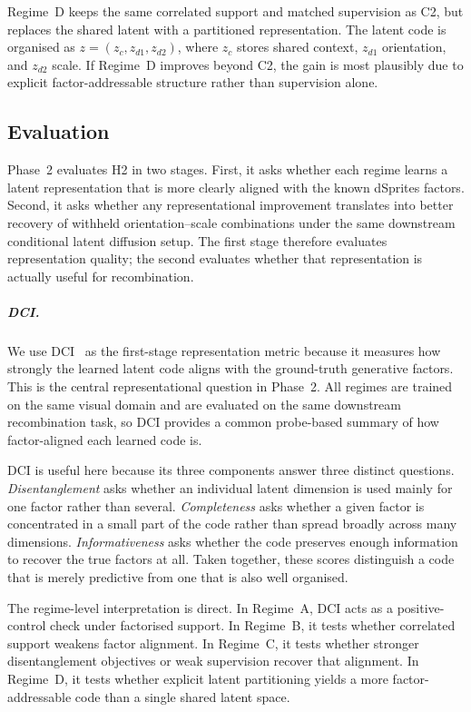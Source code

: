 Regime~D keeps the same correlated support and matched supervision as C2, but replaces the shared latent with a partitioned representation. The latent code is organised as \(z=(z_c,z_{d1},z_{d2})\), where \(z_c\) stores shared context, \(z_{d1}\) orientation, and \(z_{d2}\) scale. If Regime~D improves beyond C2, the gain is most plausibly due to explicit factor-addressable structure rather than supervision alone.

\subsection{Evaluation}
\label{subsec:p2_eval}

Phase~2 evaluates H2 in two stages. First, it asks whether each regime learns a latent representation that is more clearly aligned with the known dSprites factors. Second, it asks whether any representational improvement translates into better recovery of withheld orientation--scale combinations under the same downstream conditional latent diffusion setup. The first stage therefore evaluates representation quality; the second evaluates whether that representation is actually useful for recombination.

\subparagraph{DCI.}
We use DCI~\citep{eastwood2018framework,challeau2019challenging} as the first-stage representation metric because it measures how strongly the learned latent code aligns with the ground-truth generative factors. This is the central representational question in Phase~2. All regimes are trained on the same visual domain and are evaluated on the same downstream recombination task, so DCI provides a common probe-based summary of how factor-aligned each learned code is.

DCI is useful here because its three components answer three distinct questions. \emph{Disentanglement} asks whether an individual latent dimension is used mainly for one factor rather than several. \emph{Completeness} asks whether a given factor is concentrated in a small part of the code rather than spread broadly across many dimensions. \emph{Informativeness} asks whether the code preserves enough information to recover the true factors at all. Taken together, these scores distinguish a code that is merely predictive from one that is also well organised.

The regime-level interpretation is direct. In Regime~A, DCI acts as a positive-control check under factorised support. In Regime~B, it tests whether correlated support weakens factor alignment. In Regime~C, it tests whether stronger disentanglement objectives or weak supervision recover that alignment. In Regime~D, it tests whether explicit latent partitioning yields a more factor-addressable code than a single shared latent space.

